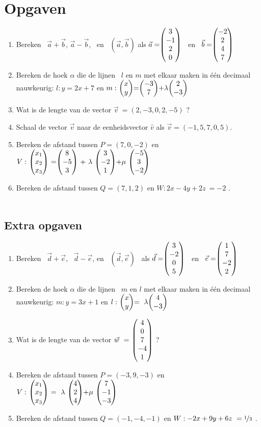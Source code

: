\newpage
\section{Opgaven}
\begin{enumerate}
	\item  Bereken \ $ \vec{a} + \vec{b} $, \quad $ \vec{a} - \vec{b} $, \ en \ $  (\vec{a} , \vec{b}) $  als $ \vec{a} = \vecvier{3}{-1}{2}{0}  $ \  en \  $  \vec{b} =  \vecvier{-2}{2}{4}{7} $
	
	\item  Bereken de hoek $\alpha$ die de  lijnen \ $  l $ en $ m $ met elkaar maken in één decimaal nauwkeurig:
	$ l:  y = 2x +7  $ en $ m: \  \vectwee{x}{y} = \vectwee{-3}{7} + \lambda \vectwee{2}{-3}  $
	
	\item Wat is de lengte van de vector $  \vec{v} \ = (2, -3, 0, 2, -5) $ ?
	
	\item Schaal de vector $  \vec{v} $ naar de eenheidsvector $\hat{v}$
	als $  \vec{v} = (-1, 5, 7, 0, 5) $.
	
	\item Bereken de afstand tussen  $  P = (7,0,-2)  $ en 
	$ V: \ \vecdriesnel{x} \
	=  \vecdrie {8} {-5} {3}  \
	+  \ \lambda \ \vecdrie{3}{-2}{1} 
	+ \mu \  \vecdrie{-5}{3}{-2} $ 
	
	\item   Bereken de afstand tussen  $  Q = (7,1,2)  $ en 
	$ W:2x - 4y +2z \ = -2 $ . \\ \\ 
	
\end{enumerate}

\subsection{Extra opgaven}
\begin{enumerate}
	\item Bereken 
	\ $ \vec{d} + \vec{e} $, \ $ \vec{d} - \vec{e} $, en \ $  (\vec{d} , \vec{e}) $ \ als 
	\quad $ \vec{d} = \vecvier{3}{-2}{0}{5}  $ \  en \  $  \vec{e} =  \vecvier{1}{7}{-2}{2} $ 	
	
	\item  Bereken de hoek $\alpha$ die de  lijnen \ $  m $ en $ l $ met elkaar maken in één decimaal nauwkeurig:
	$ m:  y = 3x + 1  $ en $ l: \  \vectwee{x}{y} = \  \lambda \vectwee{4}{-3}  $
	
	\item Wat is de lengte van de vector $  \vec{w} \ = \ \vecvijf{4}{0}{7}{-4}{1} $ ?
	
	\item Bereken de afstand tussen  $  P = (-3,9,-3)  $ en 
	$ V: \ \vecdriesnel{x} \ =  \ \lambda \ \vecdrie{4}{2}{4} + \mu \  \vecdrie{7}{-1}{-3} $	
	
	\item   Bereken de afstand tussen  $  Q = (-1,-4,-1)  $ en 
	$ W: -2x + 9y + 6z \ = \nicefrac{1}{3} $ .
\end{enumerate}

